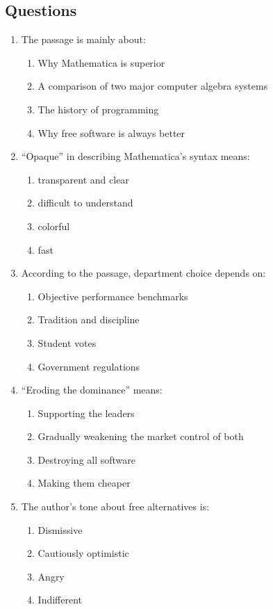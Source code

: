 \documentclass[10pt,a4paper]{article}
\begin{document}
\subsection*{Questions}

\begin{enumerate}[label=\textbf{\arabic*.}]
\item The passage is mainly about:
\begin{enumerate}[label=(\Alph*)]
\item Why Mathematica is superior
\item A comparison of two major computer algebra systems
\item The history of programming
\item Why free software is always better
\end{enumerate}

\item ``Opaque'' in describing Mathematica's syntax means:
\begin{enumerate}[label=(\Alph*)]
\item transparent and clear \item difficult to understand
\item colorful \item fast
\end{enumerate}

\item According to the passage, department choice depends on:
\begin{enumerate}[label=(\Alph*)]
\item Objective performance benchmarks
\item Tradition and discipline
\item Student votes
\item Government regulations
\end{enumerate}

\item ``Eroding the dominance'' means:
\begin{enumerate}[label=(\Alph*)]
\item Supporting the leaders
\item Gradually weakening the market control of both
\item Destroying all software
\item Making them cheaper
\end{enumerate}

\item The author's tone about free alternatives is:
\begin{enumerate}[label=(\Alph*)]
\item Dismissive \item Cautiously optimistic
\item Angry \item Indifferent
\end{enumerate}
\end{enumerate}
\end{document}
